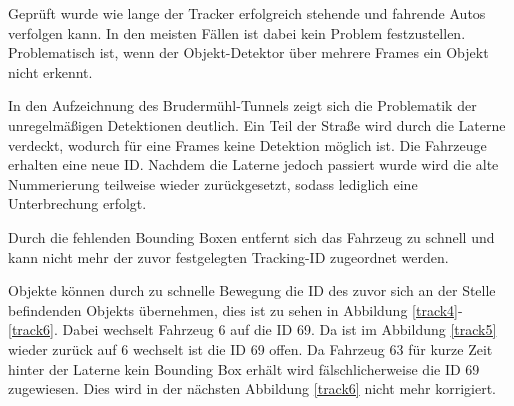 \documentclass[conference]{IEEEtran}
\begin{document}
	Geprüft wurde wie lange der Tracker erfolgreich stehende und fahrende Autos verfolgen kann. In den meisten Fällen ist dabei kein Problem festzustellen. Problematisch ist, wenn der Objekt-Detektor über mehrere Frames ein Objekt nicht erkennt.
	
	In den Aufzeichnung des Brudermühl-Tunnels zeigt sich die Problematik der
	unregelmäßigen Detektionen deutlich. Ein Teil der Straße wird durch die Laterne
	verdeckt, wodurch für eine Frames keine Detektion möglich ist. Die Fahrzeuge
	erhalten eine neue ID. Nachdem die Laterne jedoch passiert wurde wird die alte
	Nummerierung teilweise wieder zurückgesetzt, sodass lediglich eine Unterbrechung
	erfolgt.
	
	Durch die fehlenden Bounding Boxen entfernt sich das Fahrzeug zu schnell und kann nicht
	mehr der zuvor festgelegten Tracking-ID zugeordnet werden.
	
	Objekte können durch zu schnelle Bewegung die ID des zuvor sich an der Stelle
	befindenden Objekts übernehmen, dies ist zu sehen in Abbildung \ref{track4}-\ref{track6}.
	Dabei wechselt Fahrzeug 6 auf die ID 69. Da ist im Abbildung \ref{track5} wieder zurück auf 6
	wechselt ist die ID 69 offen. Da Fahrzeug 63 für kurze Zeit hinter der Laterne kein Bounding Box erhält wird fälschlicherweise die ID 69 zugewiesen.
	Dies wird in der nächsten Abbildung \ref{track6} nicht mehr korrigiert.
	
\end{document}
